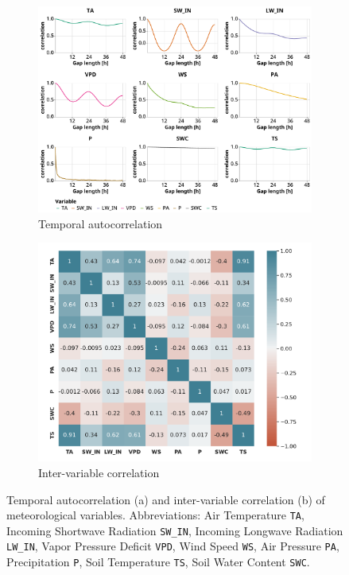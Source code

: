 \documentclass{article}
\begin{document}
\begin{figure}
\centering
\begin{subfigure}{\textwidth}
    \centering
    \includegraphics[width=4.5in]{temporal_autocorrelation}
    \caption{Temporal autocorrelation}%
    \label{fig:temp_autocorr}
\end{subfigure}
\begin{subfigure}{\textwidth}
        \centering%
        \includegraphics[width=4in]{correlation}%
        \caption{Inter-variable correlation}%
        \label{fig:corr}%
\end{subfigure}
\caption{Temporal autocorrelation (a) and inter-variable correlation (b) of meteorological variables.  Abbreviations: Air Temperature \texttt{TA}, Incoming Shortwave Radiation \texttt{SW\_IN}, Incoming Longwave Radiation \texttt{LW\_IN}, Vapor Pressure Deficit \texttt{VPD}, Wind Speed \texttt{WS}, Air Pressure \texttt{PA}, Precipitation \texttt{P}, Soil Temperature \texttt{TS}, Soil Water Content \texttt{SWC}.}
    \label{fig:correlation}
\end{figure}
\end{document}
